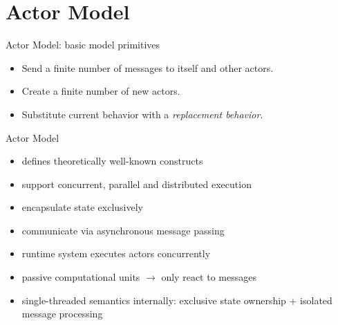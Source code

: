 \documentclass{beamer}
\begin{document}

\section{Actor Model}


\begin{frame}{Actor Model: basic model primitives}

\begin{itemize}
  \item Send a finite number of messages to itself and other actors.
  \item Create a finite number of new actors.
  \item Substitute current behavior with a \textit{replacement behavior}.
\end{itemize}

\end{frame}


\begin{frame}{Actor Model}


\begin{itemize}
  \item defines theoretically well-known constructs
  \item support concurrent, parallel and distributed execution
  \item encapsulate state exclusively
  \item communicate via asynchronous message passing
  \item runtime system executes actors concurrently
  \item passive computational units $\rightarrow$ only react to messages
  \item single-threaded semantics internally: exclusive state ownership $+$ isolated message processing
\end{itemize}

\end{frame}
\end{document}
